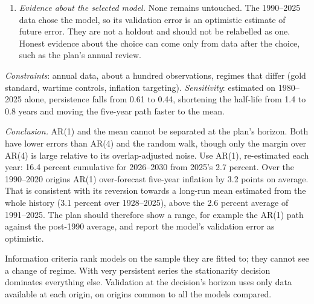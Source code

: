 \begin{qfmethod}
\begin{enumerate}
\begin{center}
\begin{tabular}{@{}lrrrrr@{}}
Mean error (pp) & $-3.21$ & $-4.10$ & $-4.63$ & $+0.60$ & $-10.44$ \\
\bottomrule
\end{tabular}
\end{center}
Consecutive five-year windows share four years, so the errors overlap: AR(1)'s autocorrelate at 0.76 at lag 1, and the 31 errors carry about the information of six separate windows. A Diebold--Mariano comparison with Newey--West standard errors over four lags gives $t=2.61$ for AR(4) against AR(1), but $-0.40$ against the mean and $-1.45$ against the random walk. With so few effective observations even the first is only indicative. One-year forecasts tell the same story: RMSE 1.45 against 1.60 percent for AR(4).
\item \emph{Evidence about the selected model.} None remains untouched. The 1990--2025 data chose the model, so its validation error is an optimistic estimate of future error. They are not a holdout and should not be relabelled as one. Honest evidence about the choice can come only from data after the choice, such as the plan's annual review.
\end{enumerate}

\emph{Constraints}: annual data, about a hundred observations, regimes that differ (gold standard, wartime controls, inflation targeting). \emph{Sensitivity}: estimated on 1980--2025 alone, persistence falls from 0.61 to 0.44, shortening the half-life from 1.4 to 0.8 years and moving the five-year path faster to the mean.

\emph{Conclusion.} AR(1) and the mean cannot be separated at the plan's horizon. Both have lower errors than AR(4) and the random walk, though only the margin over AR(4) is large relative to its overlap-adjusted noise. Use AR(1), re-estimated each year: 16.4 percent cumulative for 2026--2030 from 2025's 2.7 percent. Over the 1990--2020 origins AR(1) over-forecast five-year inflation by 3.2 points on average. That is consistent with its reversion towards a long-run mean estimated from the whole history (3.1 percent over 1928--2025), above the 2.6 percent average of 1991--2025. The plan should therefore show a range, for example the AR(1) path against the post-1990 average, and report the model's validation error as optimistic.

 Information criteria rank models on the sample they are fitted to; they cannot see a change of regime. With very persistent series the stationarity decision dominates everything else. Validation at the decision's horizon uses only data available at each origin, on origins common to all the models compared.


\end{qfmethod}

